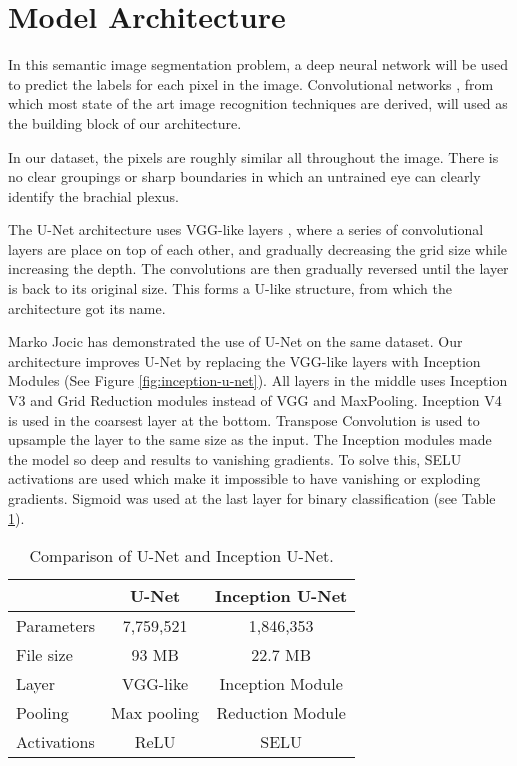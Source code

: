 \section{Model Architecture}
In this semantic image segmentation problem, a deep neural network will be used to predict the labels for each pixel in the image. Convolutional networks \cite{Lecun98gradient-basedlearning}, from which most state of the art image recognition techniques are derived, will used as the building block of our architecture.

In our dataset, the pixels are roughly similar all throughout the image. There is no clear groupings or sharp boundaries in which an untrained eye can clearly identify the brachial plexus.

The U-Net architecture \cite{2015arXiv150504597R} uses VGG-like layers \cite{2014arXiv1409.1556S}, where a series of convolutional layers are place on top of each other, and gradually decreasing the grid size while increasing the depth. The convolutions are then gradually reversed until the layer is back to its original size. This forms a U-like structure, from which the architecture got its name.

Marko Jocic \cite{jocicmarko-ultrasound-segmentation} has demonstrated the use of U-Net on the same dataset. Our architecture improves U-Net by replacing the VGG-like layers with Inception Modules \cite{2015arXiv151200567S} (See Figure \ref{fig:inception-u-net}). All layers in the middle uses Inception V3 and Grid Reduction modules instead of VGG and MaxPooling. Inception V4 is used in the coarsest layer at the bottom. Transpose Convolution \cite{2016arXiv160307285D} is used to upsample the layer to the same size as the input. The Inception modules made the model so deep and results to vanishing gradients. To solve this, SELU \cite{2017arXiv170602515K} activations are used which make it impossible to have vanishing or exploding gradients. Sigmoid was used at the last layer for binary classification (see Table \ref{tab:comparison}).
\begin{table}[h]
	\centering
	\begin{tabular}{l c c}
	\toprule
	\ & U-Net & Inception U-Net \\
	\midrule
	\midrule
 	Parameters & 7,759,521\footnotemark  & 1,846,353\footnotemark[\value{footnote}] \\
	File size       & 93 MB\footnotemark[\value{footnote}]       & 22.7 MB\footnotemark[\value{footnote}] \\
    Layer           & VGG-like    & Inception Module \\
	Pooling			& Max pooling & Reduction Module \\
    Activations     & ReLU        & SELU \\
	\bottomrule
		
	\end{tabular}
	\caption{Comparison of U-Net and Inception U-Net.}
\label{tab:comparison}
\end{table}

